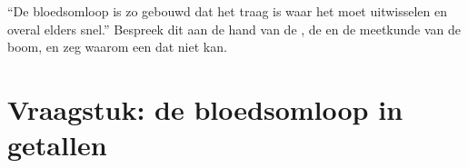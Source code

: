 \begin{exercise}[$\star\star\star$]\label{exo:b2:blood-circulation:12}
``De bloedsomloop is zo gebouwd dat het  traag is waar het moet
uitwisselen en overal elders snel.'' Bespreek dit aan de hand van de
, de  en de meetkunde van de
boom, en zeg waarom een  dat niet kan.
\end{exercise}

\section{Vraagstuk: de bloedsomloop in getallen}

